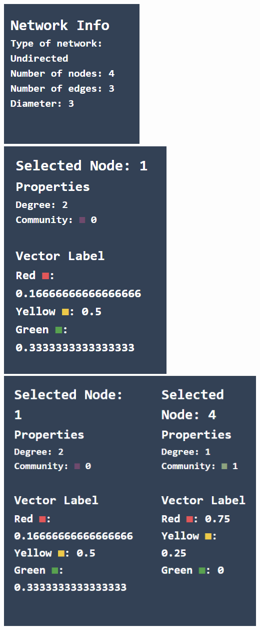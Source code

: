 \documentclass[a4paper,12pt]{report}
\begin{document}
\begin{itemize}
			\begin{center}
				\includegraphics[width=0.3\linewidth]{infobargeneral}
				\includegraphics[width=0.22\linewidth]{infobar1}
				\includegraphics[width=0.3\linewidth]{infobar2}
			\end{center}
			\end{itemize}
			
\end{document}
